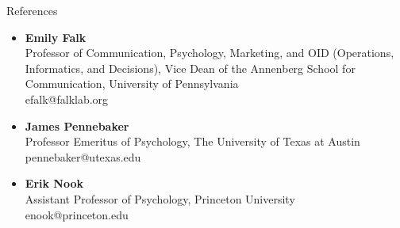 \documentclass[
  11pt,
  ignorenonframetext,
]{beamer}
\begin{document}
\begin{frame}
\begin{block}{References}
\label{references}
\begin{itemize}
\item
  \textbf{Emily Falk}\\
  Professor of Communication, Psychology, Marketing, and OID
  (Operations, Informatics, and Decisions), Vice Dean of the Annenberg
  School for Communication, University of Pennsylvania\\
  efalk@falklab.org
\item
  \textbf{James Pennebaker}\\
  Professor Emeritus of Psychology, The University of Texas at Austin\\
  pennebaker@utexas.edu
\item
  \textbf{Erik Nook}\\
  Assistant Professor of Psychology, Princeton University\\
  enook@princeton.edu
\end{itemize}
\end{block}
\end{frame}
\end{document}
